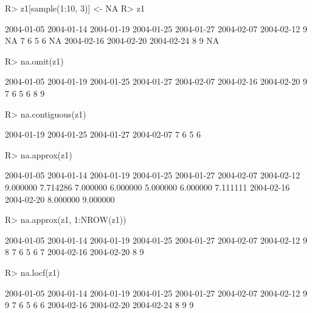\documentclass[article,nojss]{jss}
\begin{document}
\begin{Schunk}
\begin{Sinput}
R> z1[sample(1:10, 3)] <- NA
R> z1
\end{Sinput}
\begin{Soutput}
2004-01-05 2004-01-14 2004-01-19 2004-01-25 2004-01-27 2004-02-07 2004-02-12 
         9         NA          7          6          5          6         NA 
2004-02-16 2004-02-20 2004-02-24 
         8          9         NA 
\end{Soutput}
\begin{Sinput}
R> na.omit(z1)
\end{Sinput}
\begin{Soutput}
2004-01-05 2004-01-19 2004-01-25 2004-01-27 2004-02-07 2004-02-16 2004-02-20 
         9          7          6          5          6          8          9 
\end{Soutput}
\begin{Sinput}
R> na.contiguous(z1)
\end{Sinput}
\begin{Soutput}
2004-01-19 2004-01-25 2004-01-27 2004-02-07 
         7          6          5          6 
\end{Soutput}
\begin{Sinput}
R> na.approx(z1)
\end{Sinput}
\begin{Soutput}
2004-01-05 2004-01-14 2004-01-19 2004-01-25 2004-01-27 2004-02-07 2004-02-12 
  9.000000   7.714286   7.000000   6.000000   5.000000   6.000000   7.111111 
2004-02-16 2004-02-20 
  8.000000   9.000000 
\end{Soutput}
\begin{Sinput}
R> na.approx(z1, 1:NROW(z1))
\end{Sinput}
\begin{Soutput}
2004-01-05 2004-01-14 2004-01-19 2004-01-25 2004-01-27 2004-02-07 2004-02-12 
         9          8          7          6          5          6          7 
2004-02-16 2004-02-20 
         8          9 
\end{Soutput}
\begin{Sinput}
R> na.locf(z1)
\end{Sinput}
\begin{Soutput}
2004-01-05 2004-01-14 2004-01-19 2004-01-25 2004-01-27 2004-02-07 2004-02-12 
         9          9          7          6          5          6          6 
2004-02-16 2004-02-20 2004-02-24 
         8          9          9 
\end{Soutput}
\end{Schunk}
\end{document}
